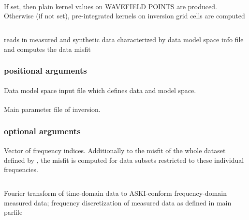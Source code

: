 \paragraph{}
If set, then plain kernel values on WAVEFIELD POINTS are produced. Otherwise (if not set), pre-integrated kernels on inversion grid cells are computed
%
%
\subsection{} \label{programs_scripts,sec:bin_prog,sec:comp_misfit}
reads in measured and synthetic data characterized by data model space info file and computes the data misfit

\subsubsection{positional arguments}
\paragraph{}
Data model space input file which defines data and model space.
\paragraph{}
Main parameter file of inversion.
\subsubsection{optional arguments}
\paragraph{}
Vector of  frequency indices. Additionally to the misfit of the whole dataset defined by , the misfit is computed for data subsets restricted to these individual frequencies.
%
%
\subsection{} \label{programs_scripts,sec:bin_prog,sec:create_measured_data}
Fourier transform of time-domain data to ASKI-conform frequency-domain measured data; frequency discretization of measured data as defined in main parfile

